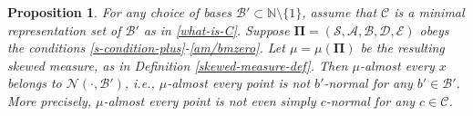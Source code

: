 \documentclass[12pt, twoside]{article}
\newtheorem{proposition}[theorem]{Proposition}
\theoremstyle{definition}
\numberwithin{equation}{section}
\begin{document}
\begin{proposition}
\label{non-normality-prop}
For any choice of bases $\mathscr{B}' \subset \mathbb{N} \setminus \{1\}$, 
assume that $\mathscr{C}$ is a minimal representation set of $\mathscr{B}'$ as  in \eqref{what-is-C}. Suppose 
$\pmb{\Pi} = (\mathcal S,  \mathcal A, \mathcal B, \mathcal D, \mathcal E)$ obeys the conditions \eqref{s-condition-plus}-\eqref{am/bmzero}.  
Let $\mu = \mu(\pmb{\Pi})$ be the resulting skewed measure, as in Definition \ref{skewed-measure-def}. Then 
$\mu$-almost every $x$ belongs to $\mathscr N(\cdot, \mathscr{B}')$, i.e., $\mu$-almost every point is not $b'$-normal for any $b' \in \mathscr{B}'$.
More precisely, $\mu$-almost every point is not even simply $c$-normal for any $c \in \mathscr{C}$. 
\end{proposition}  
\end{document}
